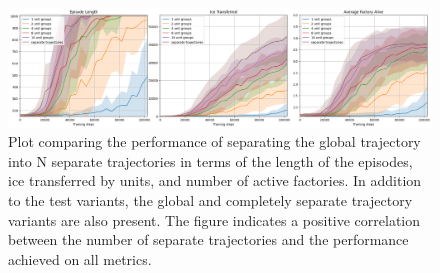 \begin{figure}[htbp]
    \centering
    \includegraphics[width=1\linewidth]{images/results_hybrid/group_size/combined.png}
    \captionsetup{justification=justified, singlelinecheck=false, width=1\linewidth, labelfont=bf} 
    \caption[]{Plot comparing the performance of separating the global trajectory into N separate trajectories in terms of the length of the episodes, ice transferred by units, and number of active factories. In addition to the test variants, the global and completely separate trajectory variants are also present. The figure indicates a positive correlation between the number of separate trajectories and the performance achieved on all metrics.}
    \label{fig:hybrid_results/group_size/combined}
\end{figure}

